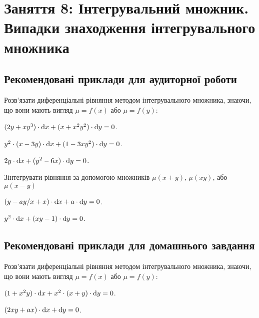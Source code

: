 \section*{Заняття 8: Інтегрувальний множник. Випадки знаходження інтегрувального множника}

\subsection*{Рекомендовані приклади для аудиторної роботи}

Розв'язати диференціальні рівняння методом інтегрувального множника, знаючи, що вони мають вигляд $\mu = f(x)$ або $\mu = f(y)$:

\begin{problem}
	$(2 y + x y^3) \cdot \mathop{}\!\mathrm{d} x + (x + x^2 y^2) \cdot \mathop{}\!\mathrm{d} y = 0$.
\end{problem}

\begin{problem}
	$y^2 \cdot (x - 3 y) \cdot \mathop{}\!\mathrm{d} x + (1 - 3 x y^2) \cdot \mathop{}\!\mathrm{d} y = 0$.
\end{problem}

\begin{problem}
	$2 y \cdot \mathop{}\!\mathrm{d} x + (y^2 - 6 x) \cdot \mathop{}\!\mathrm{d} y = 0$.
\end{problem}

Зінтегрувати рівняння за допомогою множників $\mu(x + y)$, $\mu(x y)$, або $\mu(x - y)$

\begin{problem}
	$(y - a y / x + x) \cdot \mathop{}\!\mathrm{d} x + a \cdot \mathop{}\!\mathrm{d} y = 0$.
\end{problem}

\begin{problem}
	$y^2 \cdot \mathop{}\!\mathrm{d} x + (x y - 1) \cdot \mathop{}\!\mathrm{d} y = 0$.
\end{problem}

\subsection*{Рекомендовані приклади для домашнього завдання}

Розв'язати диференціальні рівняння методом інтегрувального множника, знаючи, що вони мають вигляд $\mu = f(x)$ або $\mu = f(y)$:

\begin{problem}
	$(1 + x^2 y) \cdot \mathop{}\!\mathrm{d} x + x^2 \cdot (x + y) \cdot \mathop{}\!\mathrm{d} y = 0$.
\end{problem}

\begin{problem}
	$(2 x y + a x) \cdot \mathop{}\!\mathrm{d} x + \mathop{}\!\mathrm{d} y = 0$.
\end{problem}

